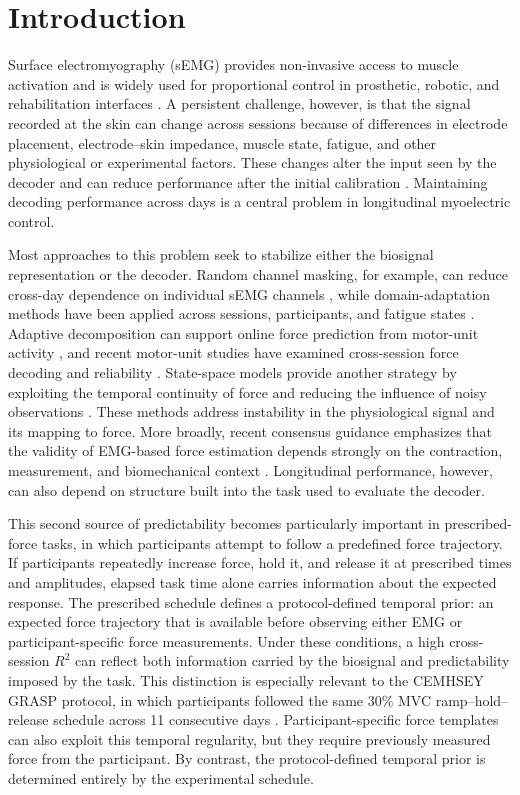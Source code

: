 \documentclass[preprint,12pt]{elsarticle}
\begin{document}
\linenumbers

\section{Introduction}

Surface electromyography (sEMG) provides non-invasive access to muscle activation and is widely used for proportional control in prosthetic, robotic, and rehabilitation interfaces \cite{Jiang2023,Farina2025}. A persistent challenge, however, is that the signal recorded at the skin can change across sessions because of differences in electrode placement, electrode--skin impedance, muscle state, fatigue, and other physiological or experimental factors. These changes alter the input seen by the decoder and can reduce performance after the initial calibration \cite{Wang2024}. Maintaining decoding performance across days is a central problem in longitudinal myoelectric control.

Most approaches to this problem seek to stabilize either the biosignal representation or the decoder. Random channel masking, for example, can reduce cross-day dependence on individual sEMG channels \cite{Jiang2022}, while domain-adaptation methods have been applied across sessions, participants, and fatigue states \cite{Li2024,Pan2025}. Adaptive decomposition can support online force prediction from motor-unit activity \cite{Zhao2024}, and recent motor-unit studies have examined cross-session force decoding and reliability \cite{Ruan2025,Roy2026,MengHu2026}. State-space models provide another strategy by exploiting the temporal continuity of force and reducing the influence of noisy observations \cite{Dutra2021,Dutra2023,Zhao2025StateSpace}. These methods address instability in the physiological signal and its mapping to force. More broadly, recent consensus guidance emphasizes that the validity of EMG-based force estimation depends strongly on the contraction, measurement, and biomechanical context \cite{Dick2024CEDE}. Longitudinal performance, however, can also depend on structure built into the task used to evaluate the decoder.

This second source of predictability becomes particularly important in prescribed-force tasks, in which participants attempt to follow a predefined force trajectory. If participants repeatedly increase force, hold it, and release it at prescribed times and amplitudes, elapsed task time alone carries information about the expected response. The prescribed schedule defines a protocol-defined temporal prior: an expected force trajectory that is available before observing either EMG or participant-specific force measurements. Under these conditions, a high cross-session $R^2$ can reflect both information carried by the biosignal and predictability imposed by the task. This distinction is especially relevant to the CEMHSEY GRASP protocol, in which participants followed the same 30\% MVC ramp--hold--release schedule across 11 consecutive days \cite{Yang2025}. Participant-specific force templates can also exploit this temporal regularity, but they require previously measured force from the participant. By contrast, the protocol-defined temporal prior is determined entirely by the experimental schedule.
\end{document}
